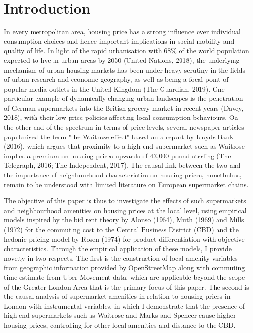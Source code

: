\documentclass{article}
\begin{document}
\section{Introduction} \label{section:intro}
In every metropolitan area, housing price has a strong influence over individual consumption choices and hence important implications in social mobility and quality of life. In light of the rapid urbanisation with 68\% of the world population expected to live in urban areas by 2050 (United Nations, 2018), the underlying mechanism of urban housing markets has been under heavy scrutiny in the fields of urban research and economic geography, as well as being a focal point of popular media outlets in the United Kingdom (The Guardian, 2019). One particular example of dynamically changing urban landscapes is the penetration of German supermarkets into the British grocery market in recent years (Davey, 2018), with their low-price policies affecting local consumption behaviours. On the other end of the spectrum in terms of price levels, several newspaper articles popularised the term "the Waitrose effect" based on a report by Lloyds Bank (2016), which argues that proximity to a high-end supermarket such as Waitrose implies a premium on housing prices upwards of 43,000 pound sterling (The Telegraph, 2016; The Independent, 2017). The causal link between the two and the importance of neighbourhood characteristics on housing prices, nonetheless, remain to be understood with limited literature on European supermarket chains.

The objective of this paper is thus to investigate the effects of such supermarkets and neighbourhood amenities on housing prices at the local level, using empirical models inspired by the bid rent theory by Alonso (1964), Muth (1969) and Mills (1972) for the commuting cost to the Central Business District (CBD) and the hedonic pricing model by Rosen (1974) for product differentiation with objective characteristics. Through the empirical application of these models, I provide novelty in two respects. The first is the construction of local amenity variables from geographic information provided by OpenStreetMap along with commuting time estimate from Uber Movement data, which are applicable beyond the scope of the Greater London Area that is the primary focus of this paper. The second is the causal analysis of supermarket amenities in relation to housing prices in London with instrumental variables, in which I demonstrate that the presence of high-end supermarkets such as Waitrose and Marks and Spencer cause higher housing prices, controlling for other local amenities and distance to the CBD.
\end{document}
